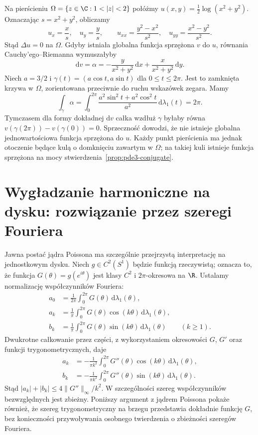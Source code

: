 \begin{kontrprzyklad}
Na pierścieniu $\Omega=\{z\in\C:1<|z|<2\}$
połóżmy $u(x,y)=\frac12\log(x^2+y^2)$.
Oznaczając $s=x^2+y^2$, obliczamy
\[
 u_x=\frac{x}{s},\quad u_y=\frac{y}{s},\qquad
 u_{xx}=\frac{y^2-x^2}{s^2},\quad
 u_{yy}=\frac{x^2-y^2}{s^2}.
\]
Stąd $\Delta u=0$ na $\Omega$. Gdyby istniała
globalna funkcja sprzężona $v$ do $u$, równania
Cauchy'ego--Riemanna wymuszałyby
\[
 \mathrm dv=\alpha
 =-\frac{y}{x^2+y^2}\,\mathrm dx
 +\frac{x}{x^2+y^2}\,\mathrm dy.
\]
Niech $a=3/2$ i $\gamma(t)=(a\cos t,a\sin t)$
dla $0\leq t\leq2\pi$. Jest to zamknięta krzywa
w $\Omega$, zorientowana przeciwnie do ruchu
wskazówek zegara. Mamy
\[
 \int_\gamma\alpha
 =\int_0^{2\pi}
 \frac{a^2\sin^2t+a^2\cos^2t}{a^2}
 \,\mathrm d\lambda_1(t)=2\pi.
\]
Tymczasem dla formy dokładnej $\mathrm dv$
całka wzdłuż $\gamma$ byłaby równa
$v(\gamma(2\pi))-v(\gamma(0))=0$.
Sprzeczność dowodzi, że nie istnieje globalna
jednowartościowa funkcja sprzężona do $u$.
Każdy punkt pierścienia ma jednak otoczenie
będące kulą o domknięciu zawartym w $\Omega$;
na takiej kuli istnieje funkcja sprzężona na mocy
stwierdzenia~\ref{prop:pde3-conjugate}.
\end{kontrprzyklad}

\section{Wygładzanie harmoniczne na dysku: rozwiązanie przez szeregi Fouriera}
\label{sec:pde3-fourier-disk}

Jawna postać jądra Poissona ma szczególnie przejrzystą
interpretację na jednostkowym dysku. Niech
$g\in C^2(S^1)$ będzie funkcją rzeczywistą; oznacza to,
że funkcja $G(\theta)=g(e^{i\theta})$ jest klasy $C^2$
i $2\pi$-okresowa na $\R$. Ustalamy normalizację
współczynników Fouriera:
\[
 \begin{aligned}
 a_0&=\frac1{2\pi}\int_0^{2\pi}G(\theta)\,
             \mathrm d\lambda_1(\theta),\\
 a_k&=\frac1\pi\int_0^{2\pi}G(\theta)\cos(k\theta)\,
             \mathrm d\lambda_1(\theta),\\
 b_k&=\frac1\pi\int_0^{2\pi}G(\theta)\sin(k\theta)\,
             \mathrm d\lambda_1(\theta)\qquad(k\geq1).
 \end{aligned}
\]
Dwukrotne całkowanie przez części, z wykorzystaniem
okresowości $G$, $G'$ oraz funkcji trygonometrycznych,
daje
\[
 \begin{aligned}
 a_k&=-\frac1{\pi k^2}\int_0^{2\pi}G''(\theta)
                \cos(k\theta)\,\mathrm d\lambda_1(\theta),\\
 b_k&=-\frac1{\pi k^2}\int_0^{2\pi}G''(\theta)
                \sin(k\theta)\,\mathrm d\lambda_1(\theta).
 \end{aligned}
\]
Stąd $|a_k|+|b_k|\leq4\|G''\|_\infty/k^2$.
W szczególności szereg współczynników bezwzględnych
jest zbieżny. Poniższy argument z jądrem Poissona
pokaże również, że szereg trygonometryczny na brzegu
przedstawia dokładnie funkcję $G$, bez konieczności
przywoływania osobnego twierdzenia o zbieżności
szeregów Fouriera.


